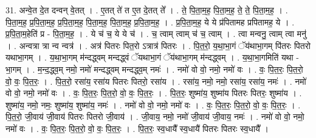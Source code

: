 \documentclass[17pt]{extarticle}
\begin{document}
31. अन्वे॒त दे॒त दन्वन् वे॒तत् । . ए॒तत् ते॑ त ए॒त दे॒तत् ते᳚ । . ते॒ पि॒ता॒म॒ह॒ पि॒ता॒म॒ह॒ ते॒ ते॒ पि॒ता॒म॒ह॒ । . पि॒ता॒म॒ह॒ प्र॒पि॒ता॒म॒ह॒ प्र॒पि॒ता॒म॒ह॒ पि॒ता॒म॒ह॒ पि॒ता॒म॒ह॒ प्र॒पि॒ता॒म॒ह॒ । . प्र॒पि॒ता॒म॒ह॒ ये ये प्र॑पितामह प्रपितामह॒ ये । . प्र॒पि॒ता॒म॒हेति॑ प्र - पि॒ता॒म॒ह॒ । . ये च॑ च॒ ये ये च॑ । . च॒ त्वाम् त्वाम् च॑ च॒ त्वाम् । . त्वा मन्वनु॒ त्वाम् त्वा मनु॑ । . अन्वत्रा त्रा न्व न्वत्र॑ । . अत्र॑ पितरः पित॒रो ऽत्रात्र॑ पितरः । . पि॒त॒रो॒ य॒था॒भा॒गं ॅय॑थाभा॒गम् पि॑तरः पितरो यथाभा॒गम् । . य॒था॒भा॒गम् म॑न्दद्ध्वम् मन्दद्ध्वं ॅयथाभा॒गं ॅय॑थाभा॒गम् म॑न्दद्ध्वम् । . य॒था॒भा॒गमिति॑ यथा - भा॒गम् । . म॒न्द॒द्ध्व॒म् नमो॒ नमो॑ मन्दद्ध्वम् मन्दद्ध्व॒म् नमः॑ । . नमो॑ वो वो॒ नमो॒ नमो॑ वः । . वः॒ पि॒त॒रः॒ पि॒त॒रो॒ वो॒ वः॒ पि॒त॒रः॒ । . पि॒त॒रो॒ रसा॑य॒ रसा॑य पितरः पितरो॒ रसा॑य । . रसा॑य॒ नमो॒ नमो॒ रसा॑य॒ रसा॑य॒ नमः॑ । . नमो॑ वो वो॒ नमो॒ नमो॑ वः । . वः॒ पि॒त॒रः॒ पि॒त॒रो॒ वो॒ वः॒ पि॒त॒रः॒ । . पि॒त॒रः॒ शुष्मा॑य॒ शुष्मा॑य पितरः पितरः॒ शुष्मा॑य । . शुष्मा॑य॒ नमो॒ नमः॒ शुष्मा॑य॒ शुष्मा॑य॒ नमः॑ । . नमो॑ वो वो॒ नमो॒ नमो॑ वः । . वः॒ पि॒त॒रः॒ पि॒त॒रो॒ वो॒ वः॒ पि॒त॒रः॒ । . पि॒त॒रो॒ जी॒वाय॑ जी॒वाय॑ पितरः पितरो जी॒वाय॑ । . जी॒वाय॒ नमो॒ नमो॑ जी॒वाय॑ जी॒वाय॒ नमः॑ । . नमो॑ वो वो॒ नमो॒ नमो॑ वः । . वः॒ पि॒त॒रः॒ पि॒त॒रो॒ वो॒ वः॒ पि॒त॒रः॒ । . पि॒त॒रः॒ स्व॒धायै᳚ स्व॒धायै॑ पितरः पितरः स्व॒धायै᳚ । \newline
\end{document}
